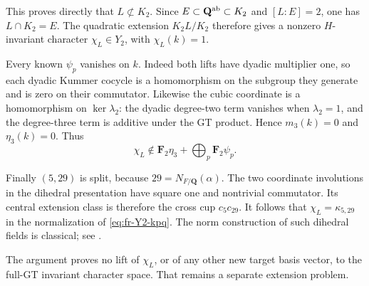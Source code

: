 This proves directly that \(L\not\subset K_2\).
Since \(E\subset\mathbf Q^{\rm ab}\subset K_2\) and
\([L:E]=2\), one has \(L\cap K_2=E\).
The quadratic extension \(K_2L/K_2\) therefore gives a
nonzero \(H\)-invariant character \(\chi_L\in Y_2\),
with \(\chi_L(k)=1\).

Every known \(\psi_p\) vanishes on \(k\).
Indeed both lifts have dyadic multiplier one, so each
dyadic Kummer cocycle is a homomorphism on the subgroup
they generate and is zero on their commutator.
Likewise the cubic coordinate is a homomorphism on
\(\ker\lambda_2\): the dyadic degree-two term vanishes
when \(\lambda_2=1\), and the degree-three term is additive
under the GT product. Hence \(m_3(k)=0\) and
\(\eta_3(k)=0\).
Thus
\[
 \chi_L\notin
 \mathbf F_2\eta_3+\bigoplus_p\mathbf F_2\psi_p.
\]

Finally \((5,29)\) is split, because \(29=N_{F/\mathbf Q}(\alpha)\).
The two coordinate involutions in the dihedral presentation
have square one and nontrivial commutator. Its central
extension class is therefore the cross cup \(c_5c_{29}\).
It follows that \(\chi_L=\kappa_{5,29}\) in the normalization
of \eqref{eq:fr-Y2-kpq}. The norm construction of such dihedral
fields is classical; see \cite[Lemma~5.1 and Corollary~5.2,
author pp.~9--10]{StevenhagenRedei2022}.

The argument proves no lift of \(\chi_L\), or of any other
new target basis vector, to the full-GT invariant character
space. That remains a separate extension problem.

